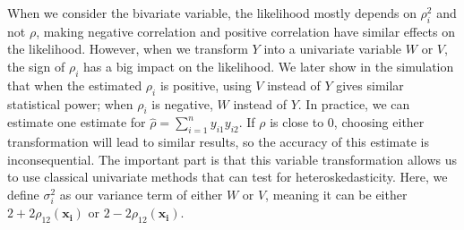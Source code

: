 \documentclass[12pt]{extarticle}
\theoremstyle{theorem}
\begin{document}
When we consider the bivariate variable, the likelihood mostly depends on $\rho_i^2$ and not $\rho$, making negative correlation and positive correlation have similar effects on the likelihood. However, when we transform $Y$ into a univariate variable $W$ or $V$, the sign of $\rho_i$ has a big impact on the likelihood. We later show in the simulation that when the estimated $\rho_i$ is positive, using $V$ instead of $Y$ gives similar statistical power; when $\rho_i$ is negative, $W$ instead of $Y$. In practice, we can estimate one estimate for $\hat{\rho} = \sum_{i=1}^{n} y_{i1} y_{i2}$. If $\rho$ is close to 0, choosing either transformation will lead to similar results, so the accuracy of this estimate is inconsequential. The important part is that this variable transformation allows us to use classical univariate methods that can test for heteroskedasticity. Here, we define $\sigma_i^2$ as our variance term of either $W$ or $V$, meaning it can be either $2 + 2\rho_{12}(\bm{x_i})$ or $2 - 2\rho_{12}(\bm{x_i})$.\\
\end{document}

